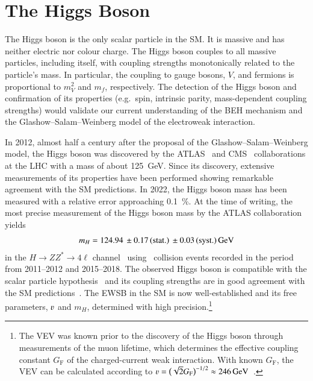 \section{The Higgs Boson}%
\label{sec:higgs_boson}

The Higgs boson is the only scalar particle in the SM. It is massive and has
neither electric nor colour charge. The Higgs boson couples to all massive
particles, including itself, with coupling strengths monotonically related to
the particle's mass. In particular, the coupling to gauge bosons, $V$, and
fermions is proportional to $m_V^2$ and $m_f$, respectively.
The detection of the Higgs boson and confirmation of its
properties (e.g.\ spin, intrinsic parity, mass-dependent coupling strengths)
would validate our current understanding of the BEH mechanism and the
Glashow--Salam--Weinberg model of the electroweak interaction.

In 2012, almost half a century after the proposal of the
Glashow--Salam--Weinberg model, the Higgs boson was discovered by the
ATLAS~\cite{HIGG-2012-27} and CMS~\cite{CMS-HIG-12-028} collaborations at the
LHC with a mass of about \SI{125}{\GeV}. Since its discovery, extensive
measurements of its properties have been performed showing remarkable agreement
with the SM predictions. In 2022, the Higgs boson mass has been measured with a
relative error approaching \SI{0.1}{\percent}. At the time of writing, the most
precise measurement of the Higgs boson mass by the ATLAS collaboration yields
\begin{align*}
  m_{H} = \num{124.94}%
  \valuesep\numerrt{0.17}{stat.}%
  \valuesep\numerrt{0.03}{syst.}%
  \valuesep\si{\GeV}
\end{align*}
in the $H \to Z Z^{*} \to 4\ell$ channel~\cite{HIGG-2020-07} using \pp~collision
events recorded in the period from 2011--2012 and 2015--2018. The observed Higgs
boson is compatible with the scalar particle
hypothesis~\cite{HIGG-2013-17-witherratum,CMS-HIG-14-018} and its coupling
strengths are in good agreement with the SM
predictions~\cite{HIGG-2021-23,CMS-HIG-22-001}. The EWSB in the SM is now
well-established and its free parameters, $\varv$ and $m_{H}$, determined with
high precision.\footnote{The VEV was known prior to the discovery of the Higgs
  boson through measurements of the muon lifetime, which determines the
  effective coupling constant $G_{\text{F}}$ of the charged-current weak
  interaction. With known $G_{\text{F}}$, the VEV can be calculated according to
  $\varv = \bigl( \sqrt{2} G_{\text{F}} \bigr)^{-1/2} \approx
  \SI{246}{\GeV}$~\cite{MuLan:2010shf}.}


